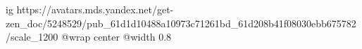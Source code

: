  
 
 
 
 

\ifcmt
  ig https://avatars.mds.yandex.net/get-zen_doc/5248529/pub_61d1d10488a10973c71261bd_61d208b41f08030ebb675782/scale_1200
	@wrap center
	@width 0.8
\fi
